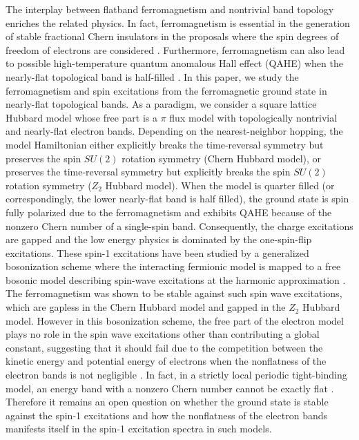 \documentclass[amsmath,superscriptaddress,showpacs,aps,prb,twocolumn]{revtex4-1}
\begin{document}
\par The interplay between flatband ferromagnetism and nontrivial band topology enriches the related physics. In fact, ferromagnetism is essential in the generation of stable fractional Chern insulators in the proposals where the spin degrees of freedom of electrons are considered \cite{TMW_PRL2011,NSRCM_PRB2011,LBFL_PRL2012}. Furthermore, ferromagnetism can also lead to possible high-temperature quantum anomalous Hall effect (QAHE) when the nearly-flat topological band is half-filled \cite{NSRCM_PRL2012}. In this paper, we study the ferromagnetism and  spin excitations from the ferromagnetic ground state in nearly-flat topological bands. As a paradigm, we consider a square lattice Hubbard model whose free part is a $\pi$ flux model with topologically nontrivial and nearly-flat electron bands. Depending on the nearest-neighbor hopping, the model Hamiltonian either explicitly breaks the time-reversal symmetry but preserves the spin $SU(2)$ rotation symmetry (Chern Hubbard model), or preserves the time-reversal symmetry but explicitly breaks the spin $SU(2)$ rotation symmetry ($Z_2$ Hubbard model). When the model is quarter filled (or correspondingly, the lower nearly-flat band is half filled), the ground state is spin fully polarized due to the ferromagnetism and exhibits QAHE because of the nonzero Chern number of a single-spin band. Consequently, the charge excitations are gapped and the low energy physics is dominated by the one-spin-flip excitations. These spin-1 excitations have been studied by a generalized bosonization scheme where the interacting fermionic model is mapped to a free bosonic model describing spin-wave excitations at the harmonic approximation \cite{DG_PRB2015}. The ferromagnetism was shown to be stable against such spin wave excitations, which are gapless in the Chern Hubbard model and gapped in the $Z_2$ Hubbard model. However in this bosonization scheme, the free part of the electron model plays no role in the spin wave excitations other than contributing a global constant, suggesting that it should fail due to the competition between the kinetic energy and potential energy of electrons when the nonflatness of the electron bands is not negligible \cite{T_PRL1994}. In fact, in a strictly local periodic tight-binding model, an energy band with a nonzero Chern number cannot be exactly flat \cite{CMST_JPMT2014}. Therefore it remains an open question on whether the ground state is stable against the spin-1 excitations and how the nonflatness of the electron bands manifests itself in the spin-1 excitation spectra in such models.
\end{document}
